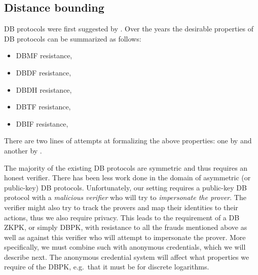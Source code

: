 \subsection{Distance bounding}%
\label{DistanceBounding}

\Ac{DB} protocols were first suggested by \citet{DistanceBounding}.
Over the years the desirable properties of \ac{DB} protocols can be summarized 
as follows:
\begin{itemize}
  \item \ac{DBMF} resistance,
  \item \ac{DBDF} resistance,
  \item \ac{DBDH} resistance,
  \item \ac{DBTF} resistance,
  \item \ac{DBIF} resistance,
\end{itemize}
There are two lines of attempts at formalizing the above properties: one by 
\citet{DB-BMV} and another by \citet{DB-DFKO}.

The majority of the existing \ac{DB} protocols are symmetric and thus requires 
an honest verifier.
There has been less work done in the domain of asymmetric (or public-key) 
\ac{DB} protocols.
Unfortunately, our setting requires a public-key \ac{DB} protocol with a 
\emph{malicious verifier} who will try to \emph{impersonate the prover}.
The verifier might also try to track the provers and map their identities to 
their actions, thus we also require privacy.
This leads to the requirement of a \ac{DB} \ac{ZKPK}, or simply \ac{DBPK}, with 
resistance to all the frauds mentioned above as well as against this verifier 
who will attempt to impersonate the prover.
More specifically, we must combine such  with anonymous credentials, 
which we will describe next.
The anonymous credential system will affect what properties we require of the 
\ac{DBPK}, e.g.\ that it  must be  for discrete logarithms.
